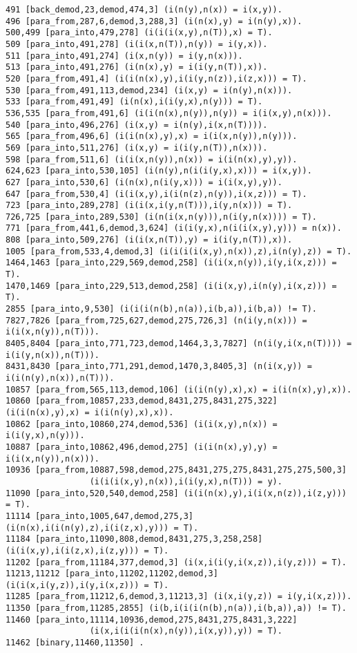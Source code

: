 {\begin{verbatim}
491 [back_demod,23,demod,474,3] (i(n(y),n(x)) = i(x,y)).
496 [para_from,287,6,demod,3,288,3] (i(n(x),y) = i(n(y),x)).
500,499 [para_into,479,278] (i(i(i(x,y),n(T)),x) = T).
509 [para_into,491,278] (i(i(x,n(T)),n(y)) = i(y,x)).
511 [para_into,491,274] (i(x,n(y)) = i(y,n(x))).
513 [para_into,491,276] (i(n(x),y) = i(i(y,n(T)),x)).
520 [para_from,491,4] (i(i(n(x),y),i(i(y,n(z)),i(z,x))) = T).
530 [para_from,491,113,demod,234] (i(x,y) = i(n(y),n(x))).
533 [para_from,491,49] (i(n(x),i(i(y,x),n(y))) = T).
536,535 [para_from,491,6] (i(i(n(x),n(y)),n(y)) = i(i(x,y),n(x))).
540 [para_into,496,276] (i(x,y) = i(n(y),i(x,n(T)))).
565 [para_from,496,6] (i(i(n(x),y),x) = i(i(x,n(y)),n(y))).
569 [para_into,511,276] (i(x,y) = i(i(y,n(T)),n(x))).
598 [para_from,511,6] (i(i(x,n(y)),n(x)) = i(i(n(x),y),y)).
624,623 [para_into,530,105] (i(n(y),n(i(i(y,x),x))) = i(x,y)).
627 [para_into,530,6] (i(n(x),n(i(y,x))) = i(i(x,y),y)).
647 [para_from,530,4] (i(i(x,y),i(i(n(z),n(y)),i(x,z))) = T).
723 [para_into,289,278] (i(i(x,i(y,n(T))),i(y,n(x))) = T).
726,725 [para_into,289,530] (i(n(i(x,n(y))),n(i(y,n(x)))) = T).
771 [para_from,441,6,demod,3,624] (i(i(y,x),n(i(i(x,y),y))) = n(x)).
808 [para_into,509,276] (i(i(x,n(T)),y) = i(i(y,n(T)),x)).
1005 [para_from,533,4,demod,3] (i(i(i(i(x,y),n(x)),z),i(n(y),z)) = T).
1464,1463 [para_into,229,569,demod,258] (i(i(x,n(y)),i(y,i(x,z))) = T).
1470,1469 [para_into,229,513,demod,258] (i(i(x,y),i(n(y),i(x,z))) = T).
2855 [para_into,9,530] (i(i(i(n(b),n(a)),i(b,a)),i(b,a)) != T).
7827,7826 [para_from,725,627,demod,275,726,3] (n(i(y,n(x))) = i(i(x,n(y)),n(T))).
8405,8404 [para_into,771,723,demod,1464,3,3,7827] (n(i(y,i(x,n(T)))) = i(i(y,n(x)),n(T))).
8431,8430 [para_into,771,291,demod,1470,3,8405,3] (n(i(x,y)) = i(i(n(y),n(x)),n(T))).
10857 [para_from,565,113,demod,106] (i(i(n(y),x),x) = i(i(n(x),y),x)).
10860 [para_from,10857,233,demod,8431,275,8431,275,322] (i(i(n(x),y),x) = i(i(n(y),x),x)).
10862 [para_into,10860,274,demod,536] (i(i(x,y),n(x)) = i(i(y,x),n(y))).
10887 [para_into,10862,496,demod,275] (i(i(n(x),y),y) = i(i(x,n(y)),n(x))).
10936 [para_from,10887,598,demod,275,8431,275,275,8431,275,275,500,3]
                 (i(i(i(x,y),n(x)),i(i(y,x),n(T))) = y).
11090 [para_into,520,540,demod,258] (i(i(n(x),y),i(i(x,n(z)),i(z,y))) = T).
11114 [para_into,1005,647,demod,275,3] (i(n(x),i(i(n(y),z),i(i(z,x),y))) = T).
11184 [para_into,11090,808,demod,8431,275,3,258,258] (i(i(x,y),i(i(z,x),i(z,y))) = T).
11202 [para_from,11184,377,demod,3] (i(x,i(i(y,i(x,z)),i(y,z))) = T).
11213,11212 [para_into,11202,11202,demod,3] (i(i(x,i(y,z)),i(y,i(x,z))) = T).
11285 [para_from,11212,6,demod,3,11213,3] (i(x,i(y,z)) = i(y,i(x,z))).
11350 [para_from,11285,2855] (i(b,i(i(i(n(b),n(a)),i(b,a)),a)) != T).
11460 [para_into,11114,10936,demod,275,8431,275,8431,3,222]
                 (i(x,i(i(i(n(x),n(y)),i(x,y)),y)) = T).
11462 [binary,11460,11350] .


\end{verbatim}}
